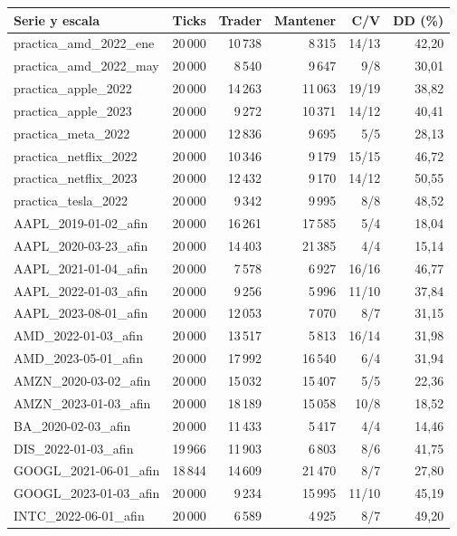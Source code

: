 \small
\begin{longtable}{lrrrrr}\toprule
Serie y escala & Ticks & Trader & Mantener & C/V & DD (\%) \\\midrule\endhead
practica\_amd\_2022\_ene & 20\,000 & 10\,738 & 8\,315 & 14/13 & 42,20 \\
practica\_amd\_2022\_may & 20\,000 & 8\,540 & 9\,647 & 9/8 & 30,01 \\
practica\_apple\_2022 & 20\,000 & 14\,263 & 11\,063 & 19/19 & 38,82 \\
practica\_apple\_2023 & 20\,000 & 9\,272 & 10\,371 & 14/12 & 40,41 \\
practica\_meta\_2022 & 20\,000 & 12\,836 & 9\,695 & 5/5 & 28,13 \\
practica\_netflix\_2022 & 20\,000 & 10\,346 & 9\,179 & 15/15 & 46,72 \\
practica\_netflix\_2023 & 20\,000 & 12\,432 & 9\,170 & 14/12 & 50,55 \\
practica\_tesla\_2022 & 20\,000 & 9\,342 & 9\,995 & 8/8 & 48,52 \\
AAPL\_2019-01-02\_afin & 20\,000 & 16\,261 & 17\,585 & 5/4 & 18,04 \\
AAPL\_2020-03-23\_afin & 20\,000 & 14\,403 & 21\,385 & 4/4 & 15,14 \\
AAPL\_2021-01-04\_afin & 20\,000 & 7\,578 & 6\,927 & 16/16 & 46,77 \\
AAPL\_2022-01-03\_afin & 20\,000 & 9\,256 & 5\,996 & 11/10 & 37,84 \\
AAPL\_2023-08-01\_afin & 20\,000 & 12\,053 & 7\,070 & 8/7 & 31,15 \\
AMD\_2022-01-03\_afin & 20\,000 & 13\,517 & 5\,813 & 16/14 & 31,98 \\
AMD\_2023-05-01\_afin & 20\,000 & 17\,992 & 16\,540 & 6/4 & 31,94 \\
AMZN\_2020-03-02\_afin & 20\,000 & 15\,032 & 15\,407 & 5/5 & 22,36 \\
AMZN\_2023-01-03\_afin & 20\,000 & 18\,189 & 15\,058 & 10/8 & 18,52 \\
BA\_2020-02-03\_afin & 20\,000 & 11\,433 & 5\,417 & 4/4 & 14,46 \\
DIS\_2022-01-03\_afin & 19\,966 & 11\,903 & 6\,803 & 8/6 & 41,75 \\
GOOGL\_2021-06-01\_afin & 18\,844 & 14\,609 & 21\,470 & 8/7 & 27,80 \\
GOOGL\_2023-01-03\_afin & 20\,000 & 9\,234 & 15\,995 & 11/10 & 45,19 \\
INTC\_2022-06-01\_afin & 20\,000 & 6\,589 & 4\,925 & 8/7 & 49,20 \\

\end{longtable}
